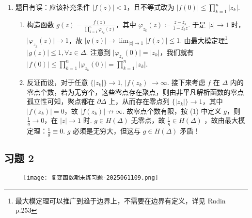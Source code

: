 \begin{enumerate}
	\item 题目有误：应该补充条件 $\lvert f(z) \rvert<1$，且不等式改为 $\lvert f(0) \rvert\leq \prod_{k=1}^{n}\lvert z_k \rvert$.
	\begin{enumerate}
		\item 构造函数 $g(z)=\frac{f(z)}{\prod_{k=1}^{n}\varphi_{z_k}(z)}$，其中 $\varphi_{z_k}(z)\coloneqq\frac{z-z_k}{1-\overline{z_k}z}$. 于是 $\lvert z \rvert\to1$ 时，$\lvert \varphi_{z_k}(z) \rvert\to1$，故 $\lvert g(z) \rvert\to \lim_{ \lvert z \rvert \to 1 }\lvert f(z) \rvert\leq1$. 由最大模定理\footnote{最大模定理可以推广到趋于边界上，不需要在边界有定义，详见 Rudin p.253} $\lvert g (z) \rvert\leq1,\forall z\in \Delta$. 注意到 $\lvert \varphi_{z_k}(0) \rvert=\lvert z_k \rvert$，我们就有 $\lvert f(0) \rvert\leq\prod_{k=1}^{n}\lvert \varphi_{z_k}(0) \rvert=\prod_{k=1}^{n}\lvert z_k \rvert$.
		\item 反证而设，对于任意 $\{ \lvert z_k \rvert \}\to 1$, $\lvert f(z_k) \rvert\to \infty$. 接下来考虑 $f$ 在 $\Delta$ 内的零点个数，若为无穷个，这些零点存在聚点，则由非平凡解析函数的零点孤立性可知，聚点都在 $\partial\Delta$ 上，从而存在零点列 $\{ \lvert z_k \rvert \}\to1$，其中 $\lvert f(z_k) \rvert=0$，故 $\lvert f (z_k) \rvert \not\to \infty$. 故零点个数有限，按 (1) 中定义 $g$，则 $\frac{1}{g}\to 0$，在 $\lvert z \rvert\to1$ 时. $g\in H(\Delta)$ 无零点，故 $\frac{1}{g}\in H(\Delta)$ ，故由最大模定理：$\frac{1}{g}\equiv0$. $g$ 必须是无穷大，但这与 $g\in H(\Delta)$ 矛盾！
	\end{enumerate}
\end{enumerate}

\subsection{习题 2}

\begin{figure}[H]
\centering
\texttt{[image: 复变函数期末练习题-2025061109.png]}
\label{}
\end{figure}

